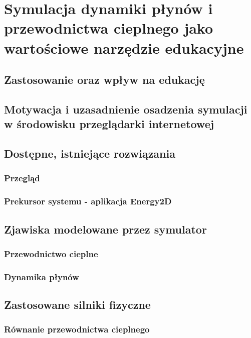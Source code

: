 \documentclass[pdflatex,12pt]{aghdpl}
\author{Piotr Janik}
\date{2012}
\begin{document}
\titlepages



\tableofcontents
\clearpage

	
	
\chapter{Symulacja dynamiki płynów i przewodnictwa cieplnego jako wartościowe narzędzie edukacyjne}
	\section{Zastosowanie oraz wpływ na edukację}
	\section{Motywacja i uzasadnienie osadzenia symulacji w środowisku przeglądarki internetowej}
	\section{Dostępne, istniejące rozwiązania}
		\subsection{Przegląd}
		\subsection{Prekursor systemu - aplikacja Energy2D}
	\section{Zjawiska modelowane przez symulator}
		\subsection{Przewodnictwo cieplne}
		\subsection{Dynamika płynów}
	\section{Zastosowane silniki fizyczne}
	\label{sec:silnikiFizyczne}
		\subsection{Równanie przewodnictwa cieplnego}
\end{document}
